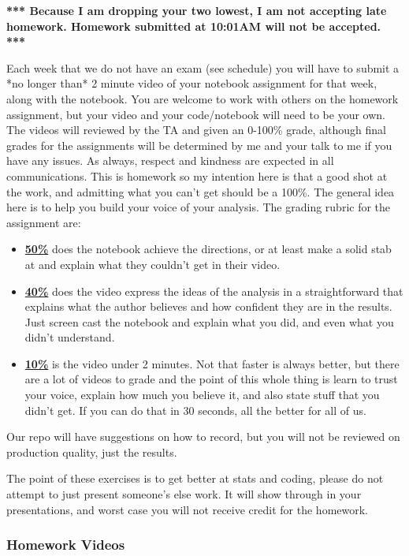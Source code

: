 \documentclass[11pt]{article}
\begin{document}
\textbf{*** Because I am dropping your two lowest, I am not accepting late homework. Homework submitted at 10:01AM will not be accepted. ***}


Each week that we do not have an exam (see schedule) you will have to submit a *no longer than* 2 minute video of your notebook assignment for that week, along with the notebook. You are welcome to work with others on the homework assignment, but your video and your code/notebook will need to be your own. The videos will reviewed by the TA and given an 0-100\% grade, although final grades for the assignments will be determined by me and your talk to me if you have any issues. As always, respect and kindness are expected in all communications. This is homework so my intention here is that a good shot at the work, and admitting what you can't get should be a 100\%. The general idea here is to help you build your voice of your analysis. The grading rubric for the assignment are:
  \begin{itemize}
\item \underline{\textbf{50\%}} does the notebook achieve the directions, or at least make a solid stab at and explain what they couldn't get in their video.  
	\item \underline{\textbf{40\%}} does the video express the ideas of the analysis in a straightforward that explains what the author believes and how confident they are in the results. Just screen cast the notebook and explain what you did, and even what you didn't understand. 
\item \underline{\textbf{10\%}} is the video under 2 minutes. Not that faster is always better, but there are a lot of videos to grade and the point of this whole thing is learn to trust your voice, explain how much you believe it, and also state stuff that you didn't get. If you can do that in 30 seconds, all the better for all of us.   
\end{itemize}

Our repo will have suggestions on how to record, but you will not be reviewed on production quality, just the results. 

The point of these exercises is to get better at stats and coding, please do not attempt to just present someone's else work. It will show through in your presentations, and worst case you will not receive credit for the homework. 



\subsubsection*{Homework Videos}
\end{document}
